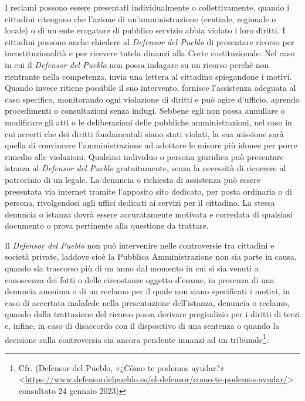 \documentclass[12pt,it,a4paper,]{report}
\begin{document}
I reclami possono essere presentati individualmente o collettivamente,
quando i cittadini ritengono che l'azione di un'amministrazione
(centrale, regionale o locale) o di un ente erogatore di pubblico
servizio abbia violato i loro diritti. I cittadini possono anche
chiedere al \emph{Defensor del Pueblo} di presentare ricorso per
incostituzionalità e per ricevere tutela dinanzi alla Corte
costituzionale. Nel caso in cui il \emph{Defensor del Pueblo} non possa
indagare su un ricorso perché non rientrante nella competenza, invia una
lettera al cittadino spiegandone i motivi. Quando invece ritiene
possibile il suo intervento, fornisce l'assistenza adeguata al caso
specifico, monitorando ogni violazione di diritti e può agire d'ufficio,
aprendo procedimenti o consultazioni senza indugi. Sebbene egli non
possa annullare o modificare gli atti o le deliberazioni delle pubbliche
amministrazioni, nel caso in cui accerti che dei diritti fondamentali
siano stati violati, la sua missione sarà quella di convincere
l'amministrazione ad adottare le misure più idonee per porre rimedio
alle violazioni. Qualsiasi individuo o persona giuridica può presentare
istanza al \emph{Defensor del Pueblo} gratuitamente, senza la necessità
di ricorrere al patrocinio di un legale. La denuncia o richiesta di
assistenza può essere presentata via internet tramite l'apposito sito
dedicato, per posta ordinaria o di persona, rivolgendosi agli uffici
dedicati ai servizi per il cittadino. La stessa denuncia o istanza dovrà
essere accuratamente motivata e corredata di qualsiasi documento o prova
pertinente alla questione da trattare.

Il \emph{Defensor del Pueblo} non può intervenire nelle controversie tra
cittadini e società private, laddove cioè la Pubblica Amministrazione
non sia parte in causa, quando sia trascorso più di un anno dal momento
in cui si sia venuti a conoscenza dei fatti o delle circostanze oggetto
d'esame, in presenza di una denuncia anonima o di un reclamo per il
quale non siano specificati i motivi, in caso di accertata malafede
nella presentazione dell'istanza, denuncia o reclamo, quando dalla
trattazione del ricorso possa derivare pregiudizio per i diritti di
terzi e, infine, in caso di disaccordo con il dispositivo di una
sentenza o quando la decisione sulla controversia sia ancora pendente
innanzi ad un tribunale\footnote{Cfr. (Defensor del Pueblo, {«¿Cómo te
  podemos ayudar?»}
  \textless{}\url{https://www.defensordelpueblo.es/el-defensor/como-te-podemos-ayudar/}\textgreater{}
  consultato 24 gennaio 2023)}.
\end{document}
